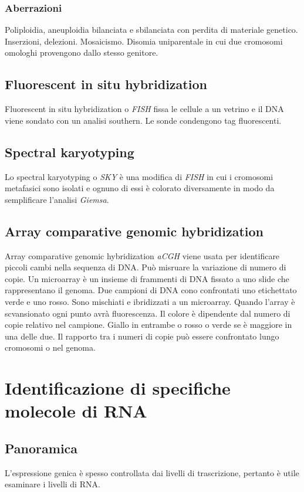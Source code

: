 		\subsubsection{Aberrazioni}
		Poliploidia, aneuploidia bilanciata e sbilanciata con perdita di materiale genetico.
		Inserzioni, delezioni.
		Mosaicismo.
		Disomia uniparentale in cui due cromosomi omologhi provengono dallo stesso genitore.

	\subsection{Fluorescent in situ hybridization}
	Fluorescent in situ hybridization o \emph{FISH} fissa le cellule a un vetrino e il DNA viene sondato con un analisi southern.
	Le sonde condengono tag fluorescenti.

	\subsection{Spectral karyotyping}
	Lo spectral karyotyping o \emph{SKY} \`e una modifica di \emph{FISH} in cui i cromosomi metafasici sono isolati e ognuno di essi \`e colorato diversamente in modo da semplificare l'analisi \emph{Giemsa}.

	\subsection{Array comparative genomic hybridization}
	Array comparative genomic hybridization \emph{aCGH} viene usata per identificare piccoli cambi nella sequenza di DNA.
	Pu\`o misruare la variazione di numero di copie.
	Un microarray \`e un insieme di frammenti di DNA fissato a uno slide che rappresentano il genoma.
	Due campioni di DNA cono confrontati uno etichettato verde e uno rosso.
	Sono mischiati e ibridizzati a un microarray.
	Quando l'array \`e scvansionato ogni punto avr\`a fluorescenza.
	Il colore \`e dipendente dal numero di copie relativo nel campione.
	Giallo in entrambe o rosso o verde se \`e maggiore in una delle due.
	Il rapporto tra i numeri di copie pu\`o essere confrontato lungo cromosomi o nel genoma.

\section{Identificazione di specifiche molecole di RNA}
	
	\subsection{Panoramica}
	L'espressione genica \`e spesso controllata dai livelli di trascrizione, pertanto \`e utile esaminare i livelli di RNA.


